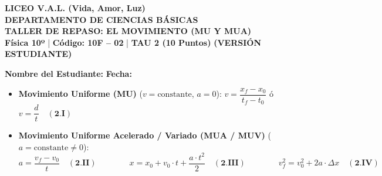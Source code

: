 \documentclass[11pt, letterpaper]{article}
\newif\ifmostrarrespuestas
\begin{document}
	
	\begin{center}
		{\Large \textbf{\color{valblue} LICEO V.A.L. (Vida, Amor, Luz)}}\\[0.1cm]
		{\large \textbf{DEPARTAMENTO DE CIENCIAS BÁSICAS}}\\[0.1cm]
		{\large \textbf{TALLER DE REPASO: EL MOVIMIENTO (MU Y MUA)}}\\[0.1cm]
		{\small \textbf{Física 10º} \quad | \quad \textbf{Código: 10F -- 02} \quad | \quad \textbf{TAU 2 (10 Puntos)} \quad 
			\ifmostrarrespuestas \textcolor{valblue}{\textbf{(VERSIÓN PROFESOR)}} \else \textbf{(VERSIÓN ESTUDIANTE)} \fi}
	\end{center}
	
	\vspace{0.2cm}
	\noindent \textbf{Nombre del Estudiante:} \underline{\hspace{8.2cm}} \hfill \textbf{Fecha:} \underline{\hspace{3cm}}
	\vspace{0.3cm}
	
	\begin{tcolorbox}[colback=valgray, colframe=valdark, arc=1mm, boxrule=0.8pt, title=\textbf{Modelos Matemáticos del TAU 2 (10F--02)}]
		\small
		\begin{itemize}[leftmargin=*, itemsep=0.1cm, topsep=0pt]
			\item \textbf{Movimiento Uniforme (MU)} ($v = \text{constante}$, $a = 0$): \quad $v = \dfrac{x_f - x_0}{t_f - t_0}$ \quad ó \quad $v = \dfrac{d}{t} \quad \mathbf{(2.I)}$
			\item \textbf{Movimiento Uniforme Acelerado / Variado (MUA / MUV)} ($a = \text{constante} \neq 0$):
			\[ a = \frac{v_f - v_0}{t} \quad \mathbf{(2.II)} \qquad\qquad x = x_0 + v_0 \cdot t + \frac{a \cdot t^2}{2} \quad \mathbf{(2.III)} \qquad\qquad v_f^2 = v_0^2 + 2a \cdot \Delta x \quad \mathbf{(2.IV)} \]
		\end{itemize}
		
	\end{tcolorbox}
	\vspace{0.3cm}
	
\end{document}
